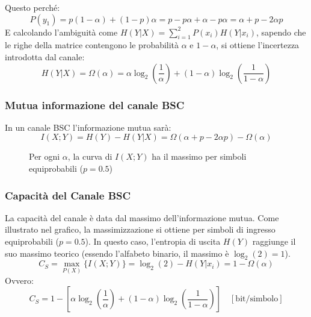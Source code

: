 Questo perché:
\[P(y_1)= p(1-\alpha) + (1-p)\alpha = p - p\alpha + \alpha - p\alpha = \alpha + p - 2\alpha p\]
E calcolando l'ambiguità come $H(Y|X) = \sum_{i=1}^2 P(x_i)H(Y|x_i)$, sapendo che le righe della matrice contengono le probabilità $\alpha$ e $1-\alpha$, si ottiene l'incertezza introdotta dal canale:
\[H(Y|X) = \Omega(\alpha) = \alpha \log_2\left(\frac{1}{\alpha}\right) + (1-\alpha)\log_2\left(\frac{1}{1-\alpha}\right)\]

\subsubsection{Mutua informazione del canale BSC}
In un canale BSC l'informazione mutua sarà:
\[I(X;Y)= H(Y) - H(Y|X) = \Omega(\alpha + p - 2\alpha p) - \Omega(\alpha)\]

\begin{figure}[ht!]
    \centering
    
    \caption{Per ogni $\alpha$, la curva di $I(X;Y)$ ha il massimo per simboli equiprobabili ($p=0.5$)}
    \label{fig:grafico-bsc}
\end{figure}
\FloatBarrier

\subsubsection{Capacità del Canale BSC}
La capacità del canale è data dal massimo dell'informazione mutua. Come illustrato nel grafico, la massimizzazione si ottiene per simboli di ingresso equiprobabili ($p = 0.5$).
In questo caso, l'entropia di uscita $H(Y)$ raggiunge il suo massimo teorico (essendo l'alfabeto binario, il massimo è $\log_2(2) = 1$).
\[C_S = \max_{P(X)} \{I(X;Y)\} = \log_2(2) - H(Y|x_i) = 1 - \Omega(\alpha)\]
Ovvero:
\[C_S = 1 - \left[ \alpha \log_2\left(\frac{1}{\alpha}\right) + (1-\alpha) \log_2\left(\frac{1}{1-\alpha}\right) \right] \quad [\text{bit/simbolo}]\]


